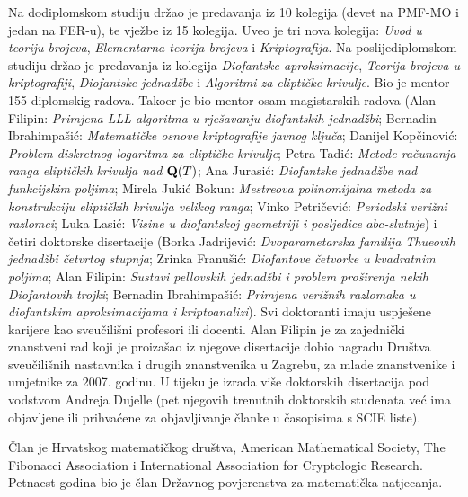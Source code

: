 \documentclass[11pt]{report}
\begin{document}
Na dodiplomskom studiju dr\v{z}ao je predavanja iz 10 kolegija
(devet na PMF-MO i jedan na FER-u), te
vje\v{z}be iz 15 kolegija. Uveo je tri nova kolegija: {\it Uvod u teoriju
brojeva}, {\it Elementarna teorija brojeva} i {\it Kriptografija}.
Na poslijediplomskom studiju dr\v{z}ao je predavanja iz kolegija
{\it Diofantske aproksimacije}, {\it Teorija brojeva u
kriptografiji}, {\it Diofantske jednad\v{z}be} i {\it Algoritmi za elipti\v{c}ke krivulje}.
Bio je mentor 155 diplomskig radova.
Tako\dj{}er je bio mentor osam
ma\-gi\-star\-skih radova (Alan Filipin: {\it Primjena LLL-algoritma
u rje\v{s}avanju diofantskih jednad\v{z}bi}; Bernadin
Ibrahimpa\v{s}i\'{c}: {\it Matemati\v{c}ke osnove kriptografije
javnog klju\v{c}a}; Danijel Kop\v{c}inovi\'{c}: {\it Problem
diskretnog logaritma za elipti\v{c}ke krivulje}; Petra Tadi\'{c}:
{\it Metode ra\v{c}unanja ranga elipti\v{c}kih krivulja nad ${\bf
Q}(T)$}; Ana Jurasi\'{c}: {\it Diofantske jednad\v{z}be nad
funkcijskim poljima}; Mirela Juki\'c Bokun: {\it Mestreova
polinomijalna metoda za konstrukciju elipti\v{c}kih krivulja velikog
ranga}; Vinko Petri\v{c}evi\'c: {\it Periodski veri\v{z}ni razlomci};
Luka Lasi\'c: {\it Visine u diofantskoj geometriji i posljedice $abc$-slutnje})
i \v{c}etiri doktorske disertacije (Borka Jadrijevi\'{c}:
{\it Dvoparametarska familija Thueovih jednad\v{z}bi \v{c}etvrtog
stupnja}; Zrinka Franu\v{s}i\'{c}: {\it Diofantove \v{c}etvorke u
kvadratnim poljima}; Alan Filipin: {\it Sustavi pellovskih
jednad\v{z}bi i problem pro\v{s}irenja nekih Diofantovih trojki};
Bernadin Ibrahimpa\v{s}i\'c: {\it Primjena veri\v{z}nih razlomaka u
diofantskim aproksimacijama i kriptoanalizi}).
Svi doktoranti imaju uspje\v{s}ene karijere kao sveu\v{c}ili\v{s}ni profesori ili docenti.
Alan Filipin je za zajedni\v{c}ki znanstveni rad koji je proiza\v{s}ao iz njegove disertacije
dobio nagradu Dru\v{s}tva sveu\v{c}ili\v{s}nih nastavnika i drugih znanstvenika u Zagrebu,
za mlade znanstvenike i umjetnike za 2007. godinu.
U tijeku je izrada vi\v{s}e
doktorskih disertacija pod vodstvom Andreja Dujelle (pet njegovih trenutnih doktorskih studenata
ve\'c ima objavljene ili prihva\'cene za objavljivanje \v{c}lanke u
\v{c}asopisima s SCIE liste).

\medskip

\v{C}lan je Hrvatskog matemati\v{c}kog dru\v{s}tva, American Mathematical
Society, The Fibonacci Association i International Association for
Cryptologic Research. Petnaest godina bio je \v{c}lan Dr\v{z}avnog
povjerenstva za matemati\v{c}ka natjecanja.
\end{document}
